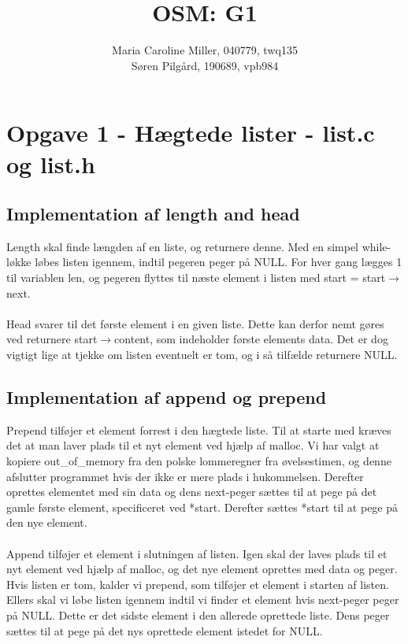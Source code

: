 \documentclass[10pt,a4paper,danish]{article}
\title{OSM: G1}
\author{Maria Caroline Miller, 040779, twq135 \\ Søren Pilgård, 190689, vpb984}
\begin{document}
\maketitle
\newpage

\tableofcontents
\newpage

\section{Opgave 1 - Hægtede lister - list.c og list.h}

\subsection{Implementation af length and head}
Length skal finde længden af en liste, og returnere denne. Med en simpel while-løkke løbes listen igennem, indtil pegeren peger på NULL. For hver gang lægges 1 til variablen len, og pegeren flyttes til næste element i listen med start = start$\rightarrow$next.\\
\\
Head svarer til det første element i en given liste. Dette kan derfor nemt gøres ved returnere start$\rightarrow$content, som indeholder første elements data. Det er dog vigtigt lige at tjekke om listen eventuelt er tom, og i så tilfælde returnere NULL.

\subsection{Implementation af append og prepend}
Prepend tilføjer et element forrest i den hægtede liste. Til at starte med kræves det at man laver plads til et nyt element ved hjælp af malloc. Vi har valgt at kopiere out\_of\_memory fra den polske lommeregner fra øvelsestimen, og denne afslutter programmet hvis der ikke er mere plads i hukommelsen. Derefter oprettes elementet med sin data og dens next-peger sættes til at pege på det gamle første element, specificeret ved *start. Derefter sættes *start til at pege på den nye element.\\
\\
Append tilføjer et element i slutningen af listen. Igen skal der laves plads til et nyt element ved hjælp af malloc, og det nye element oprettes med data og peger. Hvis listen er tom, kalder vi prepend, som tilføjer et element i starten af listen. Ellers skal vi løbe listen igennem indtil vi finder et element hvis next-peger peger på NULL. Dette er det sidste element i den allerede oprettede liste. Dens peger sættes til at pege på det nys oprettede element istedet for NULL.
\end{document}

